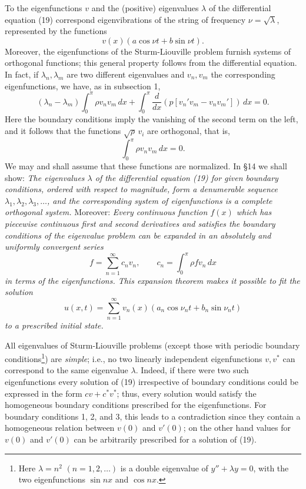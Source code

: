 To the eigenfunctions $v$ and the (positive) eigenvalues $\lambda$ of the differential equation (19) correspond eigenvibrations of the string of frequency $\nu=\sqrt\lambda$, represented by the functions
\[
v(x)(a\cos\nu t+b\sin\nu t).
\]
Moreover, the eigenfunctions of the Sturm-Liouville problem furnish systems of orthogonal functions; this general property follows from the differential equation. In fact, if $\lambda_n,\lambda_m$ are two different eigenvalues and $v_n,v_m$ the corresponding eigenfunctions, we have, as in subsection 1,
\[
(\lambda_n-\lambda_m)\int_0^\pi\rho v_nv_m\,dx
+\int_0^\pi\frac d{dx}(p[v_n'v_m-v_nv_m'])\,dx=0.
\]
Here the boundary conditions imply the vanishing of the second term on the left, and it follows that the functions $\sqrt\rho\,v_i$ are orthogonal, that is,
\[
\int_0^\pi\rho v_nv_m\,dx=0.
\]
We may and shall assume that these functions are normalized. In \S14 we shall show: \emph{The eigenvalues $\lambda$ of the differential equation (19) for given boundary conditions, ordered with respect to magnitude, form a denumerable sequence $\lambda_1,\lambda_2,\lambda_3,\ldots$, and the corresponding system of eigenfunctions is a complete orthogonal system.} Moreover: \emph{Every continuous function $f(x)$ which has piecewise continuous first and second derivatives and satisfies the boundary conditions of the eigenvalue problem can be expanded in an absolutely and uniformly convergent series}
\[
f=\sum_{n=1}^{\infty}c_nv_n,
\qquad
c_n=\int_0^\pi\rho fv_n\,dx
\]
\emph{in terms of the eigenfunctions. This expansion theorem makes it possible to fit the solution}
\[
u(x,t)=\sum_{n=1}^{\infty}v_n(x)(a_n\cos\nu_nt+b_n\sin\nu_nt)
\]
\emph{to a prescribed initial state.}

All eigenvalues of Sturm-Liouville problems (except those with periodic boundary conditions\footnote{Here $\lambda=n^2$ $(n=1,2,\ldots)$ is a double eigenvalue of $y''+\lambda y=0$, with the two eigenfunctions $\sin nx$ and $\cos nx$.}) are \emph{simple}; i.e., no two linearly independent eigenfunctions $v,v^*$ can correspond to the same eigenvalue $\lambda$. Indeed, if there were two such eigenfunctions every solution of (19) irrespective of boundary conditions could be expressed in the form $cv+c^*v^*$; thus, every solution would satisfy the homogeneous boundary conditions prescribed for the eigenfunctions. For boundary conditions 1, 2, and 3, this leads to a contradiction since they contain a homogeneous relation between $v(0)$ and $v'(0)$; on the other hand values for $v(0)$ and $v'(0)$ can be arbitrarily prescribed for a solution of (19).

